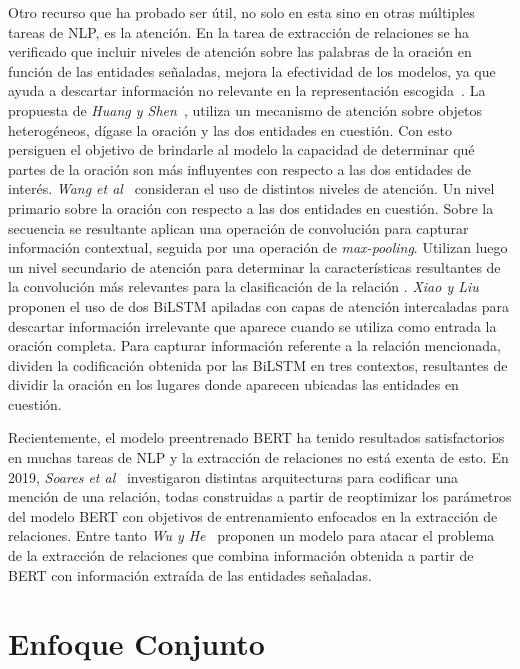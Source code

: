 Otro recurso que ha probado ser útil, no solo en esta sino en otras múltiples tareas de NLP, es la atención. 
En la tarea de extracción de relaciones se ha verificado que incluir niveles de atención sobre las palabras de la oración en función de las entidades señaladas, mejora la efectividad de los modelos, ya que ayuda a descartar información no relevante en la representación escogida~\cite{huang2016attention, wang2016relation, xiao2016semantic, lee2019semantic}.
La propuesta de \textit{Huang y Shen}~\cite{huang2016attention}, utiliza un mecanismo de atención sobre objetos heterogéneos, dígase la oración y las dos entidades en cuestión.
Con esto persiguen el objetivo de brindarle al modelo la capacidad de determinar qué partes de la oración son más influyentes con respecto a las dos entidades de interés.
\textit{Wang et al}~\cite{wang2016relation} consideran el uso de distintos niveles de atención.
Un nivel primario sobre la oración con respecto a las dos entidades en cuestión.
Sobre la secuencia se resultante aplican una operación de convolución para capturar información contextual, seguida por una operación de \textit{max-pooling}.
Utilizan luego un nivel secundario de atención para determinar la características resultantes de la convolución más relevantes para la clasificación de la relación .
\textit{Xiao y Liu}~\cite{xiao2016semantic} proponen el uso de dos BiLSTM apiladas con capas de atención intercaladas para descartar información irrelevante que aparece cuando se utiliza como entrada la oración completa.
Para capturar información referente a la relación mencionada, dividen la codificación obtenida por las BiLSTM en tres contextos, resultantes de dividir la oración en los lugares donde aparecen ubicadas las entidades en cuestión.

Recientemente, el modelo preentrenado BERT ha tenido resultados satisfactorios en muchas tareas de NLP y la extracción de relaciones no está exenta de esto.
En 2019, \textit{Soares et al}~\cite{soares2019matching} investigaron distintas arquitecturas para codificar una mención de una relación, todas construidas a partir de reoptimizar los parámetros del modelo BERT con objetivos de entrenamiento enfocados en la extracción de relaciones. 
Entre tanto \textit{Wu y He}~\cite{wu2019enriching} proponen un modelo para atacar el problema de la extracción de relaciones que combina información obtenida a partir de BERT con información extraída de las entidades señaladas.

\section{Enfoque Conjunto}

